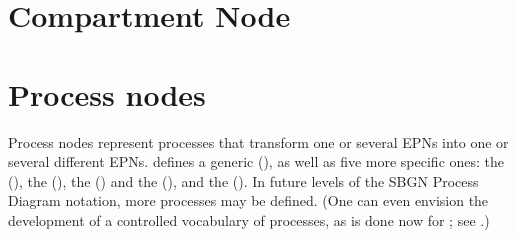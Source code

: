 


\section{Compartment Node}









\section{Process nodes}\label{sec:PNs}

Process nodes represent processes that transform one or several EPNs into one or several different EPNs.   \SBGNPDLone defines a generic  (), as well as five more specific ones: the  (), the  (), the  () and the  (), and the  ().  In future levels of the SBGN Process Diagram notation, more processes may be defined.  (One can even envision the development of a controlled vocabulary of processes, as is done now for ; see .)

